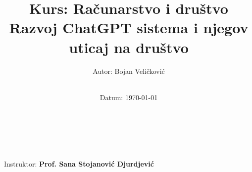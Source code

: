\title{\Large Kurs: Računarstvo i društvo  \\[0.5cm]
        \bf\Large Razvoj ChatGPT sistema i njegov uticaj na društvo}
\author{\large Autor: Bojan Veličković\\ \ \\}
\date{\large Datum: \today}

\makeatletter
    \begin{titlepage}
        \begin{center}
	    {\ \\ \ \\}
        \vbox{}\vspace{5cm}
            {\@title }\\[3cm] 
            {\@author}
            {\large Instruktor: \bf Prof. Sana Stojanović Djurdjević\\ \ \\}
            {\@date\\}

        \end{center}
    \end{titlepage}
\makeatother
